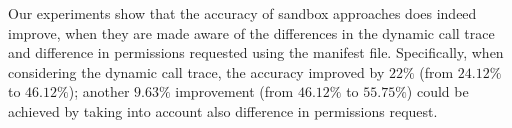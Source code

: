 %
%
% 


Our experiments show that the accuracy of sandbox approaches does indeed improve, when they are made aware of the differences in the dynamic call trace and difference in permissions requested using the manifest file. Specifically, when considering the dynamic call trace, the accuracy improved by $22\%$ (from $24.12\%$ to $46.12\%$); another $9.63\%$ improvement (from $46.12\%$ to $55.75\%$) could be achieved by taking into account also difference in permissions request. 

